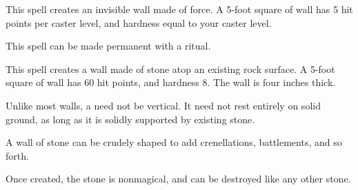 \begin{spellheader}
    \spelldur{\durshort \dismissable}
\end{spellheader}
\begin{spelleffects}
    \spellline
    \spelleffect This spell creates an invisible wall made of force. A 5-foot square of wall has 5 hit points per caster level, and hardness equal to your caster level.
\end{spelleffects}
\begin{spellfooter}
    \spellnotes \forcespellnotes

    This spell can be made permanent with a  ritual.
\end{spellfooter}

\begin{spellheader}
\end{spellheader}
\begin{spelleffects}
    \spellline
    \spelleffect This spell creates a wall made of stone atop an existing rock surface. A 5-foot square of wall has 60 hit points, and hardness 8. The wall is four inches thick.
    \par Unlike most walls, a  need not be vertical. It need not rest entirely on solid ground, as long as it is solidly supported by existing stone.
    \par A wall of stone can be crudely shaped to add crenellations, battlements, and so forth.
\end{spelleffects}
\begin{spellfooter}
    \spellnotes Once created, the stone is nonmagical, and can be destroyed like any other stone.
\end{spellfooter}

